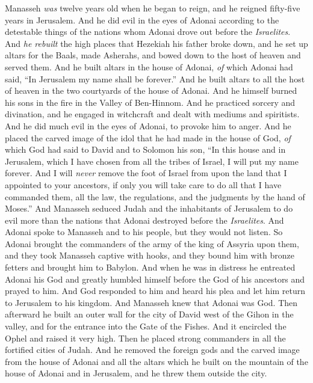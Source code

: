 \begin{biblechapter} %
 Manasseh \textit{was} twelve years old when he began to reign, and he reigned fifty-five years in Jerusalem.
\verse And he did evil in the eyes of Adonai according to the detestable things of the nations whom Adonai drove out before the \textit{Israelites}.
\verse And \textit{he rebuilt} the high places that Hezekiah his father broke down, and he set up altars for the Baals, made Asherahs, and bowed down to the host of heaven and served them.
\verse And he built altars in the house of Adonai, \textit{of} which Adonai had said, “In Jerusalem my name shall be forever.”
\verse And he built altars to all the host of heaven in the two courtyards of the house of Adonai.
\verse And he himself burned his sons in the fire in the Valley of Ben-Hinnom. And he practiced sorcery and divination, and he engaged in witchcraft and dealt with mediums and spiritists. And he did much evil in the eyes of Adonai, to provoke him to anger.
\verse And he placed the carved image of the idol that he had made in the house of God, \textit{of} which God had said to David and to Solomon his son, “In this house and in Jerusalem, which I have chosen from all the tribes of Israel, I will put my name forever.
\verse And I will \textit{never} remove the foot of Israel from upon the land that I appointed to your ancestors, if only you will take care to do all that I have commanded them, all the law, the regulations, and the judgments by the hand of Moses.”
\verse And Manasseh seduced Judah and the inhabitants of Jerusalem to do evil more than the nations that Adonai destroyed before the \textit{Israelites}.
 And Adonai spoke to Manasseh and to his people, but they would not listen.
\verse So Adonai brought the commanders of the army of the king of Assyria upon them, and they took Manasseh captive with hooks, and they bound him with bronze fetters and brought him to Babylon.
\verse And when he was in distress he entreated Adonai his God and greatly humbled himself before the God of his ancestors
\verse and prayed to him. And God responded to him and heard his plea and let him return to Jerusalem to his kingdom. And Manasseh knew that Adonai was God.
\verse Then afterward he built an outer wall for the city of David west of the Gihon in the valley, and for the entrance into the Gate of the Fishes. And it encircled the Ophel and raised it very high. Then he placed strong commanders in all the fortified cities of Judah.
\verse And he removed the foreign gods and the carved image from the house of Adonai and all the altars which he built on the mountain of the house of Adonai and in Jerusalem, and he threw them outside the city.

\end{biblechapter}
